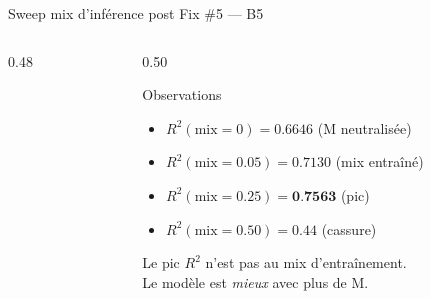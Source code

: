 \documentclass[10pt]{beamer}
\begin{document}
\begin{frame}{Sweep mix d'inférence post Fix \#5 --- B5}
\begin{columns}
\begin{column}{0.48\textwidth}
    \end{column}
    \begin{column}{0.50\textwidth}
      \begin{block}{Observations}
        \footnotesize
        \begin{itemize}
          \item $R^2(\mathrm{mix}{=}0) = 0.6646$ \hfill (M neutralisée)
          \item $R^2(\mathrm{mix}{=}0.05) = 0.7130$ \hfill (mix entraîné)
          \item $R^2(\mathrm{mix}{=}0.25) = \textbf{0.7563}$ \hfill (\alert{pic})
          \item $R^2(\mathrm{mix}{=}0.50) = 0.44$ \hfill (cassure)
        \end{itemize}
      \end{block}

      \begin{verdictbox}
        \centering\footnotesize
        Le pic $R^2$ n'est pas au mix d'entraînement.\\
        Le modèle est \emph{mieux} avec plus de M.
      \end{verdictbox}
    \end{column}
  \end{columns}
\end{frame}
\end{document}
